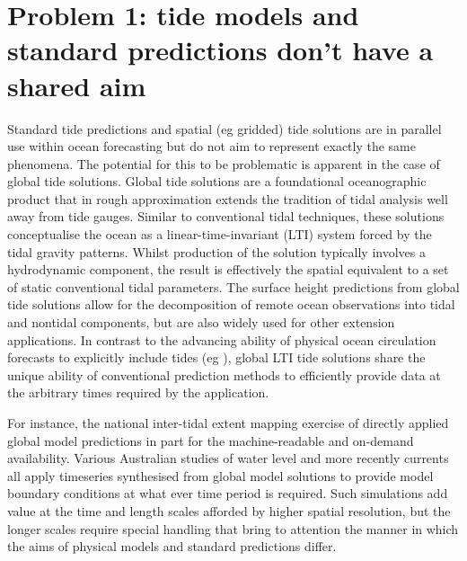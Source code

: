 \section{Problem 1: tide models and standard predictions don't have a shared aim}
\label{Sec:OfficialGlobal}
Standard tide predictions and spatial (eg gridded) tide solutions are in parallel use within ocean forecasting but do not aim to represent exactly the same phenomena.    The potential for this to be problematic is apparent in the case of global tide solutions. 
Global tide solutions are a foundational oceanographic product that in rough approximation extends the tradition of tidal analysis well away from tide gauges.   Similar to conventional tidal techniques, these solutions conceptualise the ocean as a linear-time-invariant (LTI) system forced by the tidal gravity patterns. Whilst production of the solution typically involves a hydrodynamic component\cite{Egbert:2002ug}, the result is effectively the spatial equivalent to a set of static conventional tidal parameters.   The surface height predictions from global tide solutions allow for the decomposition of remote ocean observations into tidal and nontidal components, but are also widely used for other extension applications.
In contrast to the advancing ability of physical ocean circulation forecasts to explicitly include tides (eg \cite{10.1016/j.ocemod.2019.02.008}), global LTI tide solutions share the unique ability of conventional prediction methods to efficiently provide data at the arbitrary times required by the application.


For instance, the national inter-tidal extent mapping exercise of \citet{10.3390/rs10030480}  directly applied global model predictions in part for the machine-readable and on-demand availability.
Various Australian studies of water level \citep{Haigh:2013bn}\citep{Pattiaratchi2018} and more recently currents \citep{10.5194/os-2020-107} all apply timeseries synthesised from global model solutions to provide model boundary conditions at what ever time period is required.    Such simulations add value at the time and length scales afforded by higher spatial resolution, but the longer scales require special handling that bring to attention the manner in which the aims of physical models and standard predictions differ.

